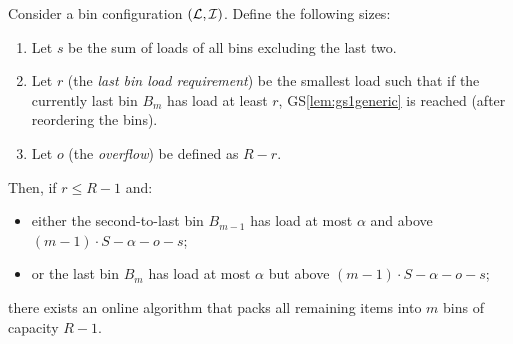 \begin{goodsit}\label{lem:gs3generic}
Consider a bin configuration $({\mathcal L},{\mathcal I})$. Define the following
sizes:

\begin{enumerate}
\item Let $s$ be the sum of loads of all bins excluding the last two.
\item Let $r$ (the \emph{last bin load requirement}) be
the smallest load such that if the currently last bin $B_m$ has load at least $r$,
GS\ref{lem:gs1generic} is reached (after reordering the bins).
\item Let $o$ (the \emph{overflow}) be defined as $R-r$.
\end{enumerate}

Then, if $r \le R-1$ and:

\begin{itemize}
\item either the second-to-last bin $B_{m-1}$ has load at most $\alpha$
and above $(m-1)\cdot S - \alpha - o - s$;
\item or the last bin $B_m$ has load at most $\alpha$
but above $(m-1)\cdot S - \alpha - o - s$;
\end{itemize}

there exists an online algorithm that packs all remaining items into
$m$ bins of capacity $R-1$.
\end{goodsit}

